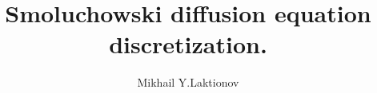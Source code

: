 \documentclass[12pt,a4paper]{article}
\begin{document}
\title{Smoluchowski diffusion equation discretization.}

\author{Mikhail Y.Laktionov}

\maketitle
\end{document}
